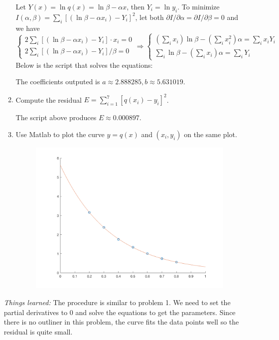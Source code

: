 \documentclass[10pt]{report}
\begin{document}
\begin{enumerate}
\begin{enumerate}
		Let $Y(x) = \ln{q(x)} = \ln{\beta} - \alpha x$, then $Y_i = \ln {y_i}$. To minimize $I(\alpha, \beta) = \sum_i [(\ln{\beta} - \alpha x_i) - Y_i]^2$, let both $\partial{I}/\partial{\alpha} = \partial{I}/\partial{\beta} = 0$ and we have
		\[
		\begin{cases}
		2\sum_i [(\ln{\beta} - \alpha x_i) - Y_i] \cdot x_i = 0\\
		2\sum_i [(\ln{\beta} - \alpha x_i) - Y_i] / \beta = 0
		\end{cases}
		\Rightarrow
		\begin{cases}
		(\sum_i x_i)\ln{\beta} - (\sum_i x_i^2)\alpha = \sum_i x_i Y_i\\
		\sum_i \ln{\beta} - (\sum_i x_i)\alpha = \sum_i Y_i
		\end{cases}
		\]
		Below is the script that solves the equations:
		
		The coefficients outputed is $a\approx 2.888285, b\approx 5.631019$.
		
		\item 
		Compute the residual $E = \sum_{i=1}^{7} [q(x_i) - y_i]^2$.
		
		The script above produces $E\approx 0.000897$.
		
		\item 
		Use Matlab to plot the curve $y=q(x)$ and $(x_i, y_i)$ on the same plot.
		
		\begin{figure}[H]
			\centering
			\includegraphics[width=0.5\linewidth]{hw5p2}
		\end{figure}
	\end{enumerate}
	\textit{Things learned:} The procedure is similar to problem 1. We need to set the partial derivatives to 0 and solve the equations to get the parameters. Since there is no outliner in this problem, the curve fits the data points well so the residual is quite small.
\end{enumerate}

\newpage
\end{document}
